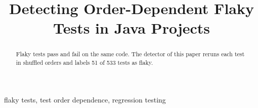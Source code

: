\documentclass[10pt,conference]{IEEEtran}
\begin{document}
\title{Detecting Order-Dependent Flaky Tests in Java Projects}
\author{}
\maketitle
\begin{abstract}
Flaky tests pass and fail on the same code. The detector of this paper reruns each test in shuffled orders and
labels 51 of 533 tests as flaky.
\end{abstract}
\begin{IEEEkeywords}
flaky tests, test order dependence, regression testing
\end{IEEEkeywords}

\end{document}
